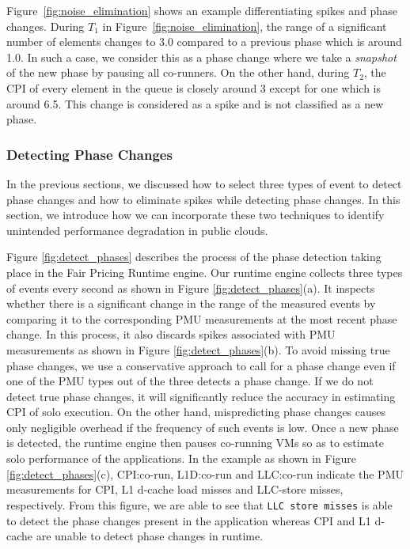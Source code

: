 \documentclass{sig-alternate}
\begin{document}
Figure~\ref{fig:noise_elimination} shows an example differentiating spikes and phase changes. During $T_{1}$ in Figure~\ref{fig:noise_elimination}, the range of a significant number of elements changes to 3.0 compared to a previous phase which is around 1.0. In such a case, we consider this as a phase change where we take a \textit{snapshot} of the new phase by pausing all co-runners. On the other hand, during $T_{2}$, the CPI of every element in the queue is closely around 3 except for one which is around 6.5. This change is considered as a spike and is not classified as a new phase. 
\subsubsection{Detecting Phase Changes}
\label{subsubsec:DetectingPhaseChanges}

In the previous sections, we discussed how to select three types of event to detect phase changes and how to eliminate spikes while detecting phase changes. In this section, we introduce how we can incorporate these two techniques to identify unintended performance degradation in public clouds.

Figure \ref{fig:detect_phases} describes the process of the phase detection taking place in the Fair Pricing Runtime engine. Our runtime engine collects three types of events every second as shown in Figure \ref{fig:detect_phases}(a). It inspects whether there is a significant change in the range of the measured events by comparing it to the corresponding PMU measurements at the most recent phase change. In this process, it also discards spikes associated with PMU measurements as shown in Figure \ref{fig:detect_phases}(b). To avoid missing true phase changes, we use a conservative approach to call for a phase change even if one of the PMU types out of the three detects a phase change. If we do not detect true phase changes, it will significantly reduce the accuracy in estimating CPI of solo execution. On the other hand, mispredicting phase changes causes only negligible overhead if the frequency of such events is low. Once a new phase is detected, the runtime engine then pauses co-running VMs so as to estimate solo performance of the applications. In the example as shown in Figure \ref{fig:detect_phases}(c), CPI:co-run, L1D:co-run and LLC:co-run indicate the PMU measurements for CPI, L1 d-cache load misses and LLC-store misses, respectively. From this figure, we are able to see that \texttt{LLC store misses} is able to detect the phase changes present in the application whereas CPI and L1 d-cache are unable to detect phase changes in runtime.
\end{document}
